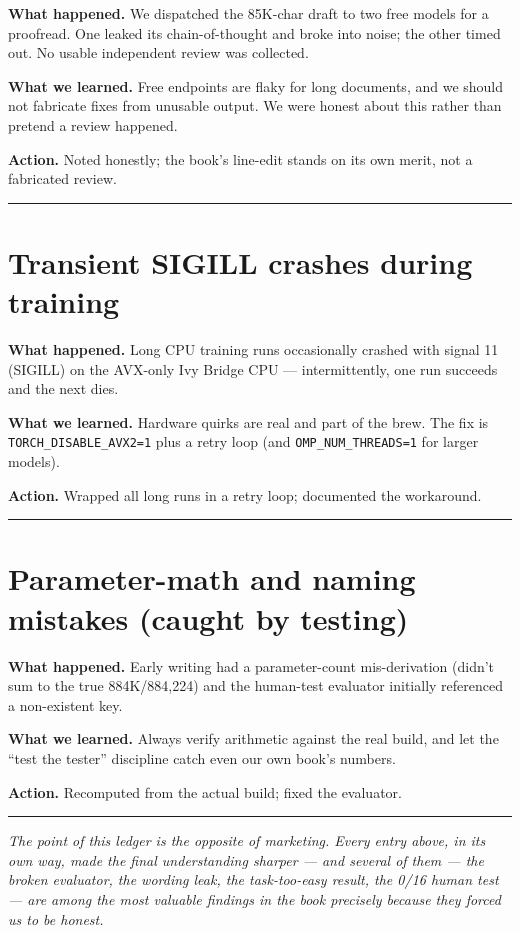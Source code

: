 \textbf{What happened.} We dispatched the 85K-char draft to two free
models for a proofread. One leaked its chain-of-thought and broke into
noise; the other timed out. No usable independent review was collected.

\textbf{What we learned.} Free endpoints are flaky for long documents,
and we should not fabricate fixes from unusable output. We were honest
about this rather than pretend a review happened.

\textbf{Action.} Noted honestly; the book's line-edit stands on its own
merit, not a fabricated review.

\begin{center}\rule{0.5\linewidth}{0.5pt}\end{center}

\section{Transient SIGILL crashes during
training}\label{transient-sigill-crashes-during-training}

\textbf{What happened.} Long CPU training runs occasionally crashed with
signal 11 (SIGILL) on the AVX-only Ivy Bridge CPU --- intermittently,
one run succeeds and the next dies.

\textbf{What we learned.} Hardware quirks are real and part of the brew.
The fix is \texttt{TORCH\_DISABLE\_AVX2=1} plus a retry loop (and
\texttt{OMP\_NUM\_THREADS=1} for larger models).

\textbf{Action.} Wrapped all long runs in a retry loop; documented the
workaround.

\begin{center}\rule{0.5\linewidth}{0.5pt}\end{center}

\section{Parameter-math and naming mistakes (caught by
testing)}\label{parameter-math-and-naming-mistakes-caught-by-testing}

\textbf{What happened.} Early writing had a parameter-count
mis-derivation (didn't sum to the true 884K/884,224) and the human-test
evaluator initially referenced a non-existent key.

\textbf{What we learned.} Always verify arithmetic against the real
build, and let the ``test the tester'' discipline catch even our own
book's numbers.

\textbf{Action.} Recomputed from the actual build; fixed the evaluator.

\begin{center}\rule{0.5\linewidth}{0.5pt}\end{center}

\emph{The point of this ledger is the opposite of marketing. Every entry
above, in its own way, made the final understanding sharper --- and
several of them --- the broken evaluator, the wording leak, the
task-too-easy result, the 0/16 human test --- are among the most
valuable findings in the book precisely because they forced us to be
honest.}
